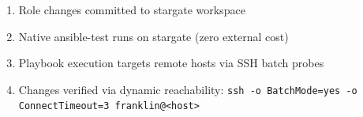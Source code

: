 \begin{enumerate}
    \item Role changes committed to stargate workspace
    \item Native ansible-test runs on stargate (zero external cost)
    \item Playbook execution targets remote hosts via SSH batch probes
    \item Changes verified via dynamic reachability: \texttt{ssh -o BatchMode=yes -o ConnectTimeout=3 franklin@\textless host\textgreater}
\end{enumerate}
